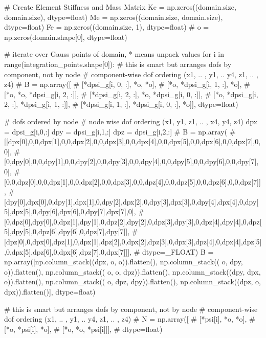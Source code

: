\begin{python}
    # Create Element Stiffness and Mass Matrix
    Ke = np.zeros((domain.size, domain.size), dtype=float)
    Me = np.zeros((domain.size, domain.size), dtype=float)
    Fe = np.zeros((domain.size, 1), dtype=float)
    # o = np.zeros(domain.shape[0], dtype=float)

    # iterate over Gauss points of domain, * means unpack values
    for i in range(integration_points.shape[0]):
        # this is smart but arranges dofs by component, not by node
        # component-wise dof ordering (x1, .. , y1, .. y4, z1, .. , z4)
        # B = np.array([
        #   [*dpsi_g[i, 0, :], *o, *o],
        #   [*o, *dpsi_g[i, 1, :], *o],
        #   [*o, *o, *dpsi_g[i, 2, :]],
        #   [*dpsi_g[i, 2, :], *o, *dpsi_g[i, 0, :]],
        #   [*o, *dpsi_g[i, 2, :], *dpsi_g[i, 1, :]],
        #   [*dpsi_g[i, 1, :], *dpsi_g[i, 0, :], *o]], dtype=float)

        # dofs ordered by node
        # node wise dof ordering (x1, y1, z1, .. , x4, y4, z4)
        dpx = dpsi_g[i,0,:]
        dpy = dpsi_g[i,1,:]
        dpz = dpsi_g[i,2,:]
        # B = np.array(
        #     [[dpx[0],0,0,dpx[1],0,0,dpx[2],0,0,dpx[3],0,0,dpx[4],0,0,dpx[5],0,0,dpx[6],0,0,dpx[7],0,0],
        #      [0,dpy[0],0,0,dpy[1],0,0,dpy[2],0,0,dpy[3],0,0,dpy[4],0,0,dpy[5],0,0,dpy[6],0,0,dpy[7],0],
        #      [0,0,dpz[0],0,0,dpz[1],0,0,dpz[2],0,0,dpz[3],0,0,dpz[4],0,0,dpz[5],0,0,dpz[6],0,0,dpz[7]],
        #      [dpy[0],dpx[0],0,dpy[1],dpx[1],0,dpy[2],dpx[2],0,dpy[3],dpx[3],0,dpy[4],dpx[4],0,dpy[5],dpx[5],0,dpy[6],dpx[6],0,dpy[7],dpx[7],0],
        #      [0,dpz[0],dpy[0],0,dpz[1],dpy[1],0,dpz[2],dpy[2],0,dpz[3],dpy[3],0,dpz[4],dpy[4],0,dpz[5],dpy[5],0,dpz[6],dpy[6],0,dpz[7],dpy[7]],
        #      [dpz[0],0,dpx[0],dpz[1],0,dpx[1],dpz[2],0,dpx[2],dpz[3],0,dpx[3],dpz[4],0,dpx[4],dpz[5],0,dpx[5],dpz[6],0,dpx[6],dpz[7],0,dpx[7]]],
        #      dtype=_FLOAT)
        B = np.array([np.column_stack((dpx,   o,   o)).flatten(),
                      np.column_stack((  o, dpy,   o)).flatten(),
                      np.column_stack((  o,   o, dpz)).flatten(),
                      np.column_stack((dpy, dpx,   o)).flatten(),
                      np.column_stack((  o, dpz, dpy)).flatten(),
                      np.column_stack((dpz,   o, dpx)).flatten()], dtype=float)

        # this is smart but arranges dofs by component, not by node
        # component-wise dof ordering (x1, .. , y1, .. y4, z1, .. , z4)
        # N = np.array([
        #   [*psi[i], *o, *o],
        #   [*o, *psi[i], *o],
        #   [*o, *o, *psi[i]]],
        #   dtype=float)


\end{python}
